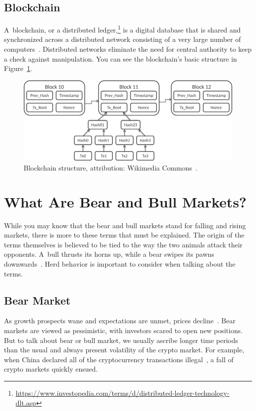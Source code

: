 \subsection*{Blockchain}
\label{blockchain}
A~blockchain, or a distributed ledger,\footnote{\url{https://www.investopedia.com/terms/d/distributed-ledger-technology-dlt.asp}} is a digital database that is shared and synchronized across a distributed network consisting of a very large number of computers~\cite{investopedia-blockchain}. Distributed networks eliminate the need for central authority to keep a check against manipulation. You can see the blockchain's basic structure in Figure~\ref{blockchain-figure}.

\begin{figure}[!t]
    \centering
    \includegraphics[width=\columnwidth]{figures/Bitcoin_Block_Data.png}
    \caption{Blockchain structure, attribution: Wikimedia Commons~\cite{wikimedia:blockchain}.}
    \label{blockchain-figure}
\end{figure}

\section{What Are Bear and Bull Markets?}
While you may know that the bear and bull markets stand for falling and rising markets, there is more to these terms that must be explained. The origin of the terms themselves is believed to be tied to the way the two animals attack their opponents. A~bull thrusts its horns up, while a bear swipes its pawns downwards~\cite{investopedia-bull-market}.
Herd behavior is important to consider when talking about the terms.

\subsection*{Bear Market}
As growth prospects wane and expectations are unmet, prices decline~\cite{investopedia-bear-market}. Bear markets are viewed as pessimistic, with investors scared to open new positions. But to talk about bear or bull market, we usually ascribe longer time periods than the usual and always present volatility of the crypto market. For example, when China declared all of the cryptocurrency transactions illegal~\cite{china-ban}, a fall of crypto markets quickly ensued.

